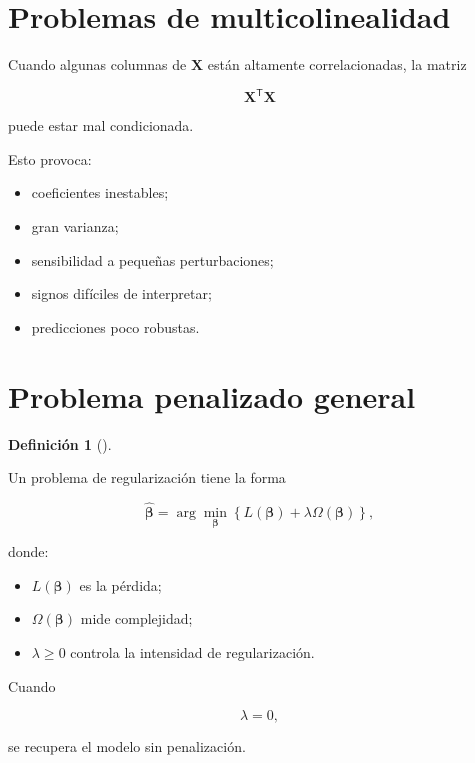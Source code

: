 \documentclass[
  spanish,
  11pt,
  letterpaper,
  DIV=11,
  numbers=noendperiod]{scrreprt}
\providecommand{\tightlist}{%
  \setlength{\itemsep}{0pt}\setlength{\parskip}{0pt}}
\theoremstyle{definition}
\newtheorem{definition}{Definición}[chapter]
\theoremstyle{plain}
\theoremstyle{definition}
\theoremstyle{remark}
\begin{document}
\section{Problemas de
multicolinealidad}\label{problemas-de-multicolinealidad}

Cuando algunas columnas de \(\mathbf{X}\) están altamente
correlacionadas, la matriz

\[
\mathbf{X}^{\mathsf T}\mathbf{X}
\]

puede estar mal condicionada.

Esto provoca:

\begin{itemize}
\tightlist
\item
  coeficientes inestables;
\item
  gran varianza;
\item
  sensibilidad a pequeñas perturbaciones;
\item
  signos difíciles de interpretar;
\item
  predicciones poco robustas.
\end{itemize}

\section{Problema penalizado general}\label{problema-penalizado-general}

\begin{definition}[]\protect\hypertarget{def-regularizacion-general}{}\label{def-regularizacion-general}

Un problema de regularización tiene la forma

\[
\widehat{\boldsymbol{\beta}}
=
\arg\min_{\boldsymbol{\beta}}
\left\{
L(\boldsymbol{\beta})
+
\lambda
\Omega(\boldsymbol{\beta})
\right\},
\]

donde:

\begin{itemize}
\tightlist
\item
  \(L(\boldsymbol{\beta})\) es la pérdida;
\item
  \(\Omega(\boldsymbol{\beta})\) mide complejidad;
\item
  \(\lambda\geq 0\) controla la intensidad de regularización.
\end{itemize}

\end{definition}

Cuando

\[
\lambda=0,
\]

se recupera el modelo sin penalización.
\end{document}
